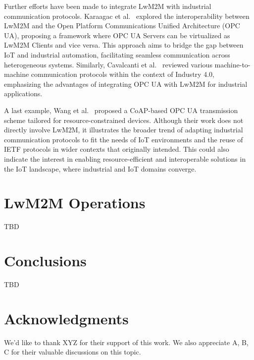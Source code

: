\documentclass[11pt,sigconf]{iabart}
\begin{document}
Further efforts have been made to integrate LwM2M with industrial communication protocols. Karaagac et al.~\cite{pop00013} explored the interoperability between LwM2M and the Open Platform Communications Unified Architecture (OPC UA), proposing a framework where OPC UA Servers can be virtualized as LwM2M Clients and vice versa. This approach aims to bridge the gap between IoT and industrial automation, facilitating seamless communication across heterogeneous systems. Similarly, Cavalcanti et al.~\cite{pop00014} reviewed various machine-to-machine communication protocols within the context of Industry 4.0, emphasizing the advantages of integrating OPC UA with LwM2M for industrial applications.

A last example, Wang et al.~\cite{pop00015} proposed a CoAP-based OPC UA transmission scheme tailored for resource-constrained devices. Although their work does not directly involve LwM2M, it illustrates the broader trend of adapting industrial communication protocols to fit the needs of IoT environments and the reuse of IETF protocols in wider contexts that originally intended. This could also indicate the interest in enabling resource-efficient and interoperable solutions in the IoT landscape, where industrial and IoT domains converge.

\section{LwM2M Operations} \label{operations}



TBD


\section{Conclusions} \label{conclusions}

TBD

\section{Acknowledgments}

We'd like to thank XYZ for their support of this work. We also appreciate A, B, C for their valuable discussions on this topic.



\end{document}
